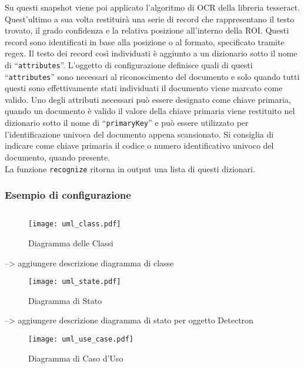 \documentclass[12pt,a4paper]{article}
\begin{document}
Su questi snapshot viene poi applicato l'algoritmo di OCR della libreria
tesseract. Quest'ultimo a sua volta restituirà una serie di record che
rappresentano il testo trovato, il grado confidenza e la relativa
posizione all'interno della ROI. Questi record sono identificati in base
alla posizione o al formato, specificato tramite regex. Il testo dei
record così individuati è aggiunto a un dizionario sotto il nome di
``\texttt{attributes}''. L'oggetto di configurazione definisce quali di
questi ``\texttt{attributes}'' sono necessari al riconoscimento del
documento e solo quando tutti questi sono effettivamente stati
individuati il documento viene marcato come valido. Uno degli attributi
necessari può essere designato come chiave primaria, quando un documento
è valido il valore della chiave primaria viene restituito nel dizionario
sotto il nome di ``\texttt{primaryKey}'' e può essere utilizzato per
l'identificazione univoca del documento appena scansionato. Si consiglia
di indicare come chiave primaria il codice o numero identificativo
univoco del documento, quando presente.\\
La funzione \texttt{recognize} ritorna in output una lista di questi
dizionari.

\pagebreak

\subsubsection{Esempio di configurazione}
\inputminted{python}{config.py}

\begin{figure}[p]
  \caption{Diagramma delle Classi}
  \centering
  \texttt{[image: uml\_class.pdf]}
\end{figure}

--> aggiungere descrizione diagramma di classe

\begin{figure}[p]
  \caption{Diagramma di Stato}
  \centering
  \texttt{[image: uml\_state.pdf]}
\end{figure}

--> aggiungere descrizione diagramma di stato per oggetto Detectron

\begin{figure}[p]
  \caption{Diagramma di Caso d'Uso}
  \centering
  \texttt{[image: uml\_use\_case.pdf]}
\end{figure}
\end{document}
